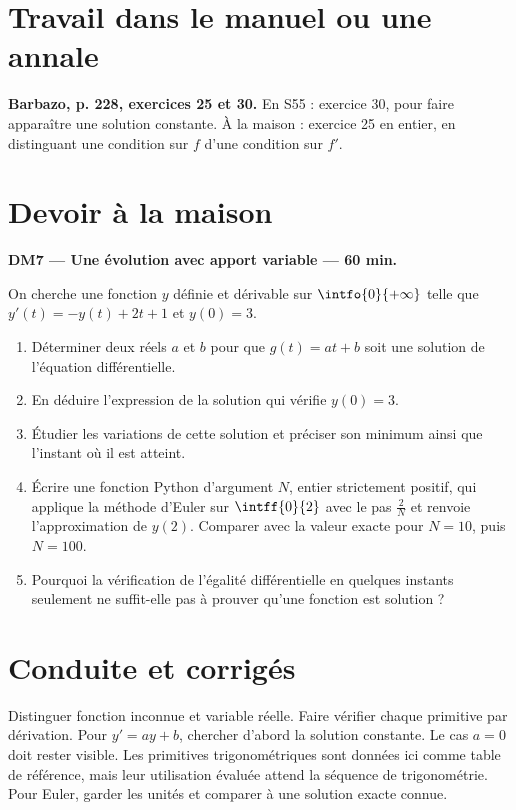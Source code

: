 \section{Travail dans le manuel ou une annale}\textbf{Barbazo, p. 228, exercices 25 et 30.} En S55 : exercice 30, pour faire apparaître une solution constante. À la maison : exercice 25 en entier, en distinguant une condition sur $f$ d'une condition sur $f'$.

\mxnewpage
\section{Devoir à la maison}\textbf{DM7 --- Une évolution avec apport variable --- 60 min.}\par On cherche une fonction $y$ définie et dérivable sur $\intfo{0}{+\infty}$ telle que $y' (t)=-y(t)+2t+1$ et $y(0)=3$.
\begin{enumerate}\item Déterminer deux réels $a$ et $b$ pour que $g(t)=at+b$ soit une solution de l'équation différentielle.
\item En déduire l'expression de la solution qui vérifie $y(0)=3$.
\item Étudier les variations de cette solution et préciser son minimum ainsi que l'instant où il est atteint.
\item Écrire une fonction Python d'argument $N$, entier strictement positif, qui applique la méthode d'Euler sur $\intff{0}{2}$ avec le pas $\frac2N$ et renvoie l'approximation de $y(2)$. Comparer avec la valeur exacte pour $N=10$, puis $N=100$.
\item Pourquoi la vérification de l'égalité différentielle en quelques instants seulement ne suffit-elle pas à prouver qu'une fonction est solution ?\end{enumerate}

\ifmxteacher\mxnewpage\section{Conduite et corrigés}\begin{teachernote}Distinguer fonction inconnue et variable réelle. Faire vérifier chaque primitive par dérivation. Pour $y'=ay+b$, chercher d'abord la solution constante. Le cas $a=0$ doit rester visible. Les primitives trigonométriques sont données ici comme table de référence, mais leur utilisation évaluée attend la séquence de trigonométrie. Pour Euler, garder les unités et comparer à une solution exacte connue.\end{teachernote}

